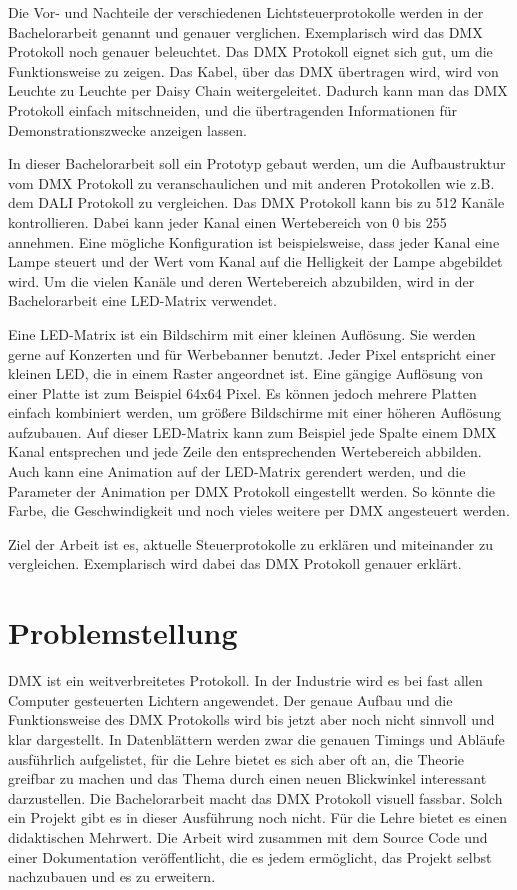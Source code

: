 Die Vor- und Nachteile der verschiedenen Lichtsteuerprotokolle werden in der Bachelorarbeit genannt und genauer verglichen. Exemplarisch wird das DMX Protokoll noch genauer beleuchtet. Das DMX Protokoll eignet sich gut, um die Funktionsweise zu zeigen. Das Kabel, über das DMX übertragen wird, wird von Leuchte zu Leuchte per Daisy Chain weitergeleitet. Dadurch kann man das DMX Protokoll einfach mitschneiden, und die übertragenden Informationen für Demonstrationszwecke anzeigen lassen.

In dieser Bachelorarbeit soll ein Prototyp gebaut werden, um die Aufbaustruktur vom DMX Protokoll zu veranschaulichen und mit anderen Protokollen wie z.B. dem DALI Protokoll zu vergleichen. Das DMX Protokoll kann bis zu 512 Kanäle kontrollieren. Dabei kann jeder Kanal einen Wertebereich von 0 bis 255 annehmen. Eine mögliche Konfiguration ist beispielsweise, dass jeder Kanal eine Lampe steuert und der Wert vom Kanal auf die Helligkeit der Lampe abgebildet wird. Um die vielen Kanäle und deren Wertebereich abzubilden, wird in der Bachelorarbeit eine LED-Matrix verwendet.

Eine LED-Matrix ist ein Bildschirm mit einer kleinen Auflösung. Sie werden gerne auf Konzerten und für Werbebanner benutzt. Jeder Pixel entspricht einer kleinen LED, die in einem Raster angeordnet ist. Eine gängige Auflösung von einer Platte ist zum Beispiel 64x64 Pixel. Es können jedoch mehrere Platten einfach kombiniert werden, um größere Bildschirme mit einer höheren Auflösung aufzubauen. Auf dieser LED-Matrix kann zum Beispiel jede Spalte einem DMX Kanal entsprechen und jede Zeile den entsprechenden Wertebereich abbilden. Auch kann eine Animation auf der LED-Matrix gerendert werden, und die Parameter der Animation per DMX Protokoll eingestellt werden. So könnte die Farbe, die Geschwindigkeit und noch vieles weitere per DMX angesteuert werden. 

Ziel der Arbeit ist es, aktuelle Steuerprotokolle zu erklären und miteinander zu vergleichen. Exemplarisch wird dabei das DMX Protokoll genauer erklärt.

\section{Problemstellung}
DMX ist ein weitverbreitetes Protokoll. In der Industrie wird es bei fast allen Computer gesteuerten Lichtern angewendet. Der genaue Aufbau und die Funktionsweise des DMX Protokolls wird bis jetzt aber noch nicht sinnvoll und klar dargestellt. In Datenblättern werden zwar die genauen Timings und Abläufe ausführlich aufgelistet, für die Lehre bietet es sich aber oft an, die Theorie greifbar zu machen und das Thema durch einen neuen Blickwinkel interessant darzustellen. Die Bachelorarbeit macht das DMX Protokoll visuell fassbar. Solch ein Projekt gibt es in dieser Ausführung noch nicht. Für die Lehre bietet es einen didaktischen Mehrwert. Die Arbeit wird zusammen mit dem Source Code und einer Dokumentation veröffentlicht, die es jedem ermöglicht, das Projekt selbst nachzubauen und es zu erweitern. 

